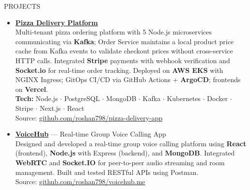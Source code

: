 \documentclass{resume} %
\begin{document}
\begin{rSection}{PROJECTS}
\begin{itemize}
\item \href{https://github.com/roshan798/pizza-delivery-app}{\textbf{Pizza Delivery Platform}}
  \hfill\\ %
  Multi-tenant pizza ordering platform with 5 Node.js microservices communicating
  via \textbf{Kafka}; Order Service maintains a local product price cache from
  Kafka events to validate checkout prices without cross-service HTTP calls.
  Integrated \textbf{Stripe} payments with webhook verification and
  \textbf{Socket.io} for real-time order tracking.
  Deployed on \textbf{AWS EKS} with NGINX Ingress; GitOps CI/CD via
  GitHub Actions + \textbf{ArgoCD}; frontends on \textbf{Vercel}.\\
  \textbf{Tech:} Node.js $\cdot$ PostgreSQL $\cdot$ MongoDB $\cdot$ Kafka
  $\cdot$ Kubernetes $\cdot$ Docker $\cdot$ Stripe $\cdot$ Next.js $\cdot$ React\\
  Source: \href{https://github.com/roshan798/pizza-delivery-app}{github.com/roshan798/pizza-delivery-app}



\item \href{https://github.com/roshan798/voicehub.me}{\textbf{VoiceHub}}
  --- Real-time Group Voice Calling App\\
  Designed and developed a real-time group voice calling platform using
  \textbf{React} (frontend), \textbf{Node.js} with Express (backend), and
  \textbf{MongoDB}. Integrated \textbf{WebRTC} and \textbf{Socket.IO} for
  peer-to-peer audio streaming and room management. Built and tested RESTful
  APIs using Postman.\\
  Source: \href{https://github.com/roshan798/voicehub.me}{github.com/roshan798/voicehub.me}




\end{itemize}
\end{rSection}
\end{document}
